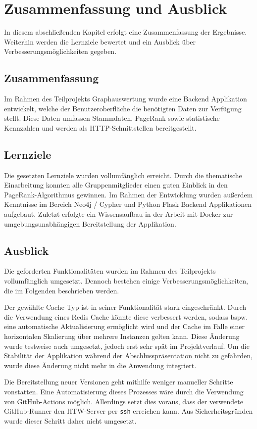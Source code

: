 \section{Zusammenfassung und Ausblick}\label{sec:07_05_zusammenfassung}
In diesem abschließenden Kapitel erfolgt eine Zusammenfassung der Ergebnisse.
Weiterhin werden die Lernziele bewertet und ein Ausblick über Verbesserungsmöglichkeiten gegeben.

\subsection{Zusammenfassung}
Im Rahmen des Teilprojekts Graphauswertung wurde eine Backend Applikation entwickelt, welche der Benutzeroberfläche die benötigten Daten zur Verfügung stellt.
Diese Daten umfassen Stammdaten, PageRank sowie statistische Kennzahlen und werden als HTTP-Schnittstellen bereitgestellt.

\subsection{Lernziele}
Die gesetzten Lernziele wurden vollumfänglich erreicht.
Durch die thematische Einarbeitung konnten alle Gruppenmitglieder einen guten Einblick in den PageRank-Algorithmus gewinnen.
Im Rahmen der Entwicklung wurden außerdem Kenntnisse im Bereich Neo4j / Cypher und Python Flask Backend Applikationen aufgebaut.
Zuletzt erfolgte ein Wissensaufbau in der Arbeit mit Docker zur umgebungsunabhängigen Bereitstellung der Applikation.

\subsection{Ausblick}
Die geforderten Funktionalitäten wurden im Rahmen des Teilprojekts vollumfänglich umgesetzt.
Dennoch bestehen einige Verbesserungsmöglichkeiten, die im Folgenden beschrieben werden.

Der gewählte Cache-Typ ist in seiner Funktionalität stark eingeschränkt.
Durch die Verwendung eines Redis Cache \cite{redis} könnte diese verbessert werden, sodass bspw. eine automatische Aktualisierung ermöglicht wird und der Cache im Falle einer horizontalen Skalierung über mehrere Instanzen gelten kann.
Diese Änderung wurde testweise auch umgesetzt, jedoch erst sehr spät im Projektverlauf. Um die Stabilität der Applikation während der Abschlusspräsentation nicht zu gefährden, wurde diese Änderung nicht mehr in die Anwendung integriert.

Die Bereitstellung neuer Versionen geht mithilfe weniger manueller Schritte vonstatten.
Eine Automatisierung dieses Prozesses wäre durch die Verwendung von GitHub-Actions möglich.
Allerdings setzt dies voraus, dass der verwendete GitHub-Runner den HTW-Server per \lstinline|ssh| erreichen kann.
Aus Sicherheitsgründen wurde dieser Schritt daher nicht umgesetzt.
